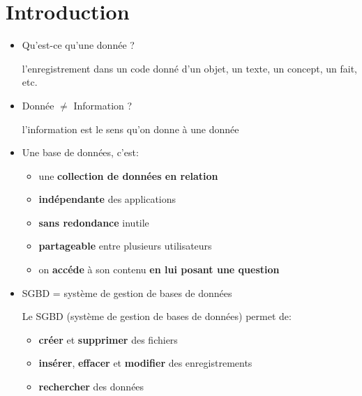 \documentclass[a4paper]{article}
\begin{document}
\section{Introduction}





\begin{itemize}



\item Qu'est-ce qu'une donnée ?
\begin{example}
    l'enregistrement dans un code donné d’un objet, un texte, un concept, un fait, etc.
\end{example}



\item Donnée $ \neq $ Information ?
\begin{example}
    l'information est le sens qu'on donne à une donnée
\end{example}



\item Une base de données, c'est:
\begin{itemize}
    \item une \textbf{collection de données en relation}
    \item \textbf{indépendante} des applications
    \item \textbf{sans redondance} inutile
    \item \textbf{partageable} entre plusieurs utilisateurs
    \item on \textbf{accéde} à son contenu \textbf{en lui posant une question}
\end{itemize}



\item SGBD = système de gestion de bases de données
\begin{example}
    Le SGBD (système de gestion de bases de données) permet de:
    \begin{itemize}
        \item \textbf{créer} et \textbf{supprimer} des fichiers
        \item \textbf{insérer}, \textbf{effacer} et \textbf{modifier} des enregistrements
        \item \textbf{rechercher} des données
    \end{itemize}
\end{example}




\end{itemize}
\end{document}
